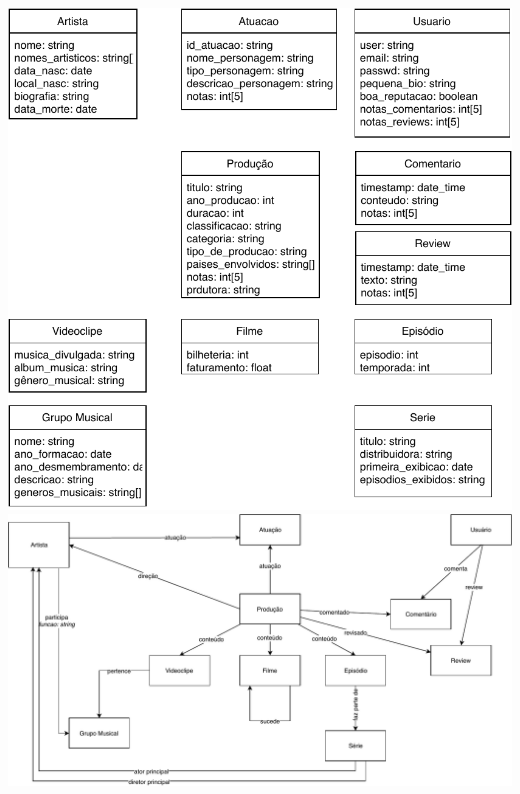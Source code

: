 \documentclass[12pt]{article}
\begin{document}
\begin{center}
\includegraphics[width=.8\linewidth]{entities_bdgrafos2.pdf}
\vspace{2em}
\includegraphics[width=\linewidth]{Diagrama_bdgrafos2.pdf}
\end{center}
\end{document}
